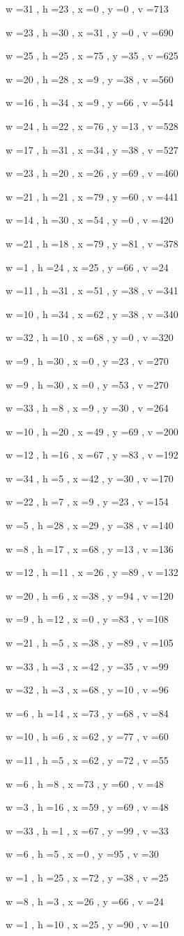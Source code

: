 \documentclass[11pt]{article}
\begin{document}
w =31 , h =23 , x =0 , y =0 , v =713
\par
w =23 , h =30 , x =31 , y =0 , v =690
\par
w =25 , h =25 , x =75 , y =35 , v =625
\par
w =20 , h =28 , x =9 , y =38 , v =560
\par
w =16 , h =34 , x =9 , y =66 , v =544
\par
w =24 , h =22 , x =76 , y =13 , v =528
\par
w =17 , h =31 , x =34 , y =38 , v =527
\par
w =23 , h =20 , x =26 , y =69 , v =460
\par
w =21 , h =21 , x =79 , y =60 , v =441
\par
w =14 , h =30 , x =54 , y =0 , v =420
\par
w =21 , h =18 , x =79 , y =81 , v =378
\par
w =1 , h =24 , x =25 , y =66 , v =24
\par
w =11 , h =31 , x =51 , y =38 , v =341
\par
w =10 , h =34 , x =62 , y =38 , v =340
\par
w =32 , h =10 , x =68 , y =0 , v =320
\par
w =9 , h =30 , x =0 , y =23 , v =270
\par
w =9 , h =30 , x =0 , y =53 , v =270
\par
w =33 , h =8 , x =9 , y =30 , v =264
\par
w =10 , h =20 , x =49 , y =69 , v =200
\par
w =12 , h =16 , x =67 , y =83 , v =192
\par
w =34 , h =5 , x =42 , y =30 , v =170
\par
w =22 , h =7 , x =9 , y =23 , v =154
\par
w =5 , h =28 , x =29 , y =38 , v =140
\par
w =8 , h =17 , x =68 , y =13 , v =136
\par
w =12 , h =11 , x =26 , y =89 , v =132
\par
w =20 , h =6 , x =38 , y =94 , v =120
\par
w =9 , h =12 , x =0 , y =83 , v =108
\par
w =21 , h =5 , x =38 , y =89 , v =105
\par
w =33 , h =3 , x =42 , y =35 , v =99
\par
w =32 , h =3 , x =68 , y =10 , v =96
\par
w =6 , h =14 , x =73 , y =68 , v =84
\par
w =10 , h =6 , x =62 , y =77 , v =60
\par
w =11 , h =5 , x =62 , y =72 , v =55
\par
w =6 , h =8 , x =73 , y =60 , v =48
\par
w =3 , h =16 , x =59 , y =69 , v =48
\par
w =33 , h =1 , x =67 , y =99 , v =33
\par
w =6 , h =5 , x =0 , y =95 , v =30
\par
w =1 , h =25 , x =72 , y =38 , v =25
\par
w =8 , h =3 , x =26 , y =66 , v =24
\par
w =1 , h =10 , x =25 , y =90 , v =10
\par
\newpage
\end{document}
